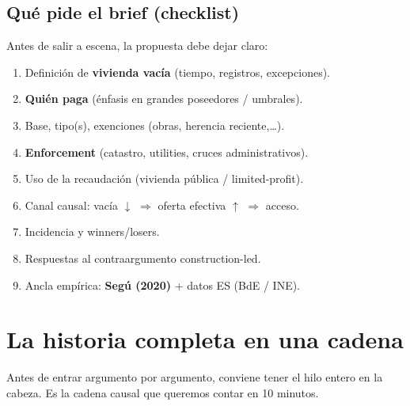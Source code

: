 \documentclass[11pt,a4paper]{report}
\begin{document}
\section{Qu\'e pide el brief (checklist)}

Antes de salir a escena, la propuesta debe dejar claro:

\begin{enumerate}
  \item Definici\'on de \textbf{vivienda vac\'ia} (tiempo, registros, excepciones).
  \item \textbf{Qui\'en paga} (\'enfasis en grandes poseedores / umbrales).
  \item Base, tipo(s), exenciones (obras, herencia reciente,\ldots).
  \item \textbf{Enforcement} (catastro, utilities, cruces administrativos).
  \item Uso de la recaudaci\'on (vivienda p\'ublica / limited-profit).
  \item Canal causal: vac\'ia $\downarrow$ $\Rightarrow$ oferta efectiva $\uparrow$ $\Rightarrow$ acceso.
  \item Incidencia y winners/losers.
  \item Respuestas al contraargumento construction-led.
  \item Ancla emp\'irica: \textbf{Seg\'u (2020)} + datos ES (BdE / INE).
\end{enumerate}

\chapter{La historia completa en una cadena}
\label{ch:cadena}

Antes de entrar argumento por argumento, conviene tener el hilo entero
en la cabeza. Es la cadena causal que queremos contar en 10 minutos.
\end{document}
